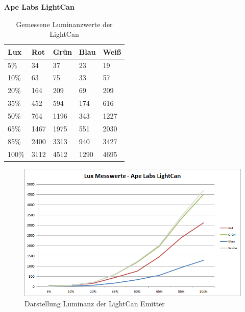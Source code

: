 \documentclass[11pt]{scrartcl}
\begin{document}
\textbf{Ape Labs LightCan}
\begin{table}[H]
    \begin{tabularx}{\textwidth}{|X|X|X|X|X|}
        \hline
        Lux   & Rot  & Grün  & Blau & Weiß\\\hline
        5\%   & 34   & 37    & 23   & 19  \\\hline
        10\%  & 63   & 75    & 33   & 57  \\\hline
        20\%  & 164  & 209   & 69   & 209 \\\hline
        35\%  & 452  & 594   & 174  & 616 \\\hline
        50\%  & 764  & 1196  & 343  & 1227\\\hline
        65\%  & 1467 & 1975  & 551  & 2030\\\hline
        85\%  & 2400 & 3313  & 940  & 3427\\\hline
        100\% & 3112 & 4512  & 1290 & 4695\\\hline
    \end{tabularx}
    \caption{Gemessene Luminanzwerte der LightCan} \label{table:luxLightCan}
\end{table}
\begin{figure}[H]
    \begin{center}
        \includegraphics[width=\textwidth]{images/charts/lightCan.png}
    \end{center}
    \caption{Darstellung Luminanz der LightCan Emitter} \label{fig:luxLightCan}
\end{figure}
\end{document}
